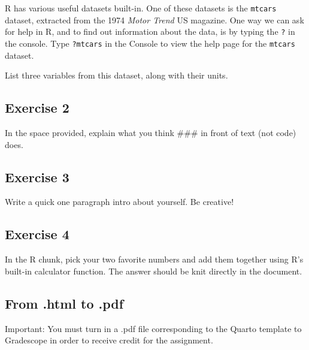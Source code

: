 \documentclass[
  letterpaper,
  DIV=11,
  numbers=noendperiod]{scrartcl}
\begin{document}
R has various useful datasets built-in. One of these datasets is the
\texttt{mtcars} dataset, extracted from the 1974 \emph{Motor Trend} US
magazine. One way we can ask for help in R, and to find out information
about the data, is by typing the \texttt{?} in the console. Type
\texttt{?mtcars} in the Console to view the help page for the
\texttt{mtcars} dataset.

List three variables from this dataset, along with their units.

\subsection{Exercise 2}\label{exercise-2}

In the space provided, explain what you think \#\#\# in front of text
(not code) does.

\subsection{Exercise 3}\label{exercise-3}

Write a quick one paragraph intro about yourself. Be creative!

\subsection{Exercise 4}\label{exercise-4}

In the R chunk, pick your two favorite numbers and add them together
using R's built-in calculator function. The answer should be knit
directly in the document.

\subsection{From .html to .pdf}\label{from-.html-to-.pdf}

Important: You must turn in a .pdf file corresponding to the Quarto
template to Gradescope in order to receive credit for the assignment.
\end{document}
